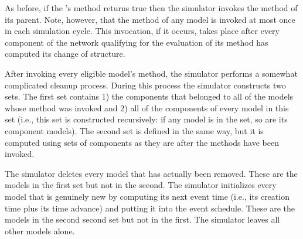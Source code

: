 As before, if the 's  method returns true then the simulator invokes the  method of its parent. Note, however, that the  method of any model is invoked at most once in each simulation cycle. This invocation, if it occurs, takes place after every component of the network qualifying for the evaluation of its  method has computed its change of structure.

After invoking every eligible model's  method, the simulator performs a somewhat complicated cleanup process. During this process the simulator constructs two sets. The first set contains 1) the components that belonged to all of the  models whose  method was invoked and 2) all of the components of every model in this set (i.e., this set is constructed recursively: if any model is in the set, so are its component models). The second set is defined in the same way, but it is computed using sets of components as they are after the  methods have been invoked.

The simulator deletes every model that has actually been removed. These are the models in the first set but not in the second. The simulator initializes every model that is genuinely new by computing its next event time (i.e., its creation time plus its time advance) and putting it into the event schedule. These are the models in the second second set but not in the first. The simulator leaves all other models alone.

